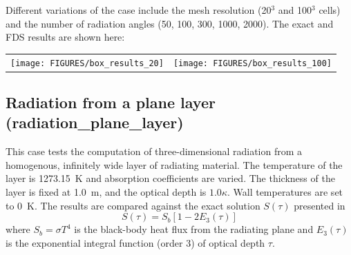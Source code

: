 \documentclass[11pt]{book}
\newcommand{\be}{\begin{equation}}
\newcommand{\ee}{\end{equation}}
\begin{document}
\noindent
Different variations of the case include the mesh resolution (20$^3$ and 100$^3$ cells)
and the number of radiation angles (50, 100, 300, 1000, 2000).
The exact and FDS results are shown here:

\begin{tabular*}{\textwidth}{lr}
\texttt{[image: FIGURES/box\_results\_20]} &
\texttt{[image: FIGURES/box\_results\_100]}
\end{tabular*}





\clearpage

\subsection{Radiation from a plane layer ({\bf radiation\_plane\_layer}) }
\label{radiation_plane_layer}

This case tests the computation of three-dimensional
radiation from a homogenous, infinitely wide layer of radiating
material.  The temperature of the layer is 1273.15~K and absorption
coefficients are varied. The thickness of the layer is fixed at 1.0~m,
and the optical depth is $1.0 \kappa$. Wall temperatures are set to 0~K.
The results are compared against the exact solution $S(\tau)$ presented
in~\cite{Zeldovich:1}
\be
S(\tau) = S_b\left[1-2E_3(\tau)\right]
\ee
where $S_b = \sigma T^4$ is the black-body heat flux from
the radiating plane and $E_3(\tau)$ is the exponential
integral function (order 3) of optical depth $\tau$.
\end{document}
